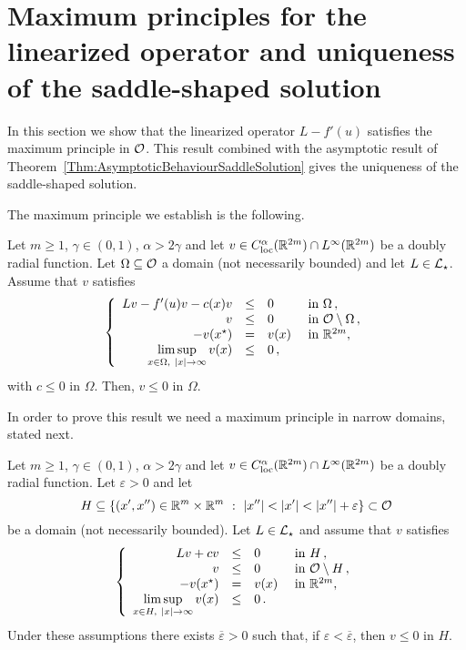 \section{Maximum principles for the linearized operator and uniqueness of the saddle-shaped solution}
\label{Sec:MaximumPrinciple}

In this section we show that the linearized operator $L -f'(u)$ satisfies the maximum principle in $\mathcal{O}$. This result combined with the asymptotic result of Theorem~\ref{Thm:AsymptoticBehaviourSaddleSolution} gives the uniqueness of the saddle-shaped solution.

The maximum principle we establish is the following.

\begin{proposition}
	\label{Prop:MaximumPrincipleInO}
	Let $m\geq 1$, $\gamma \in (0,1)$, $\alpha > 2\gamma$ and let $v\in C^\alpha_{\mathrm{loc}}(\mathbb{R}^{2m})\cap L^\infty(\mathbb{R}^{2m})$ be a doubly radial function. Let $\Omega \subseteq \mathcal{O}$ a domain (not necessarily bounded) and let $L \in \mathcal{L}_\star$. Assume that $v$ satisfies
	$$
	\left\{\begin{array}{rcll}
	Lv - f'(u)v - c(x)v &\leq & 0 &\textrm{ in } \Omega\,,\\
	v &\leq & 0 &\textrm{ in } \mathcal{O} \setminus \Omega\,,\\
	- v(x^\star) & = & v(x) &\textrm{ in } \mathbb{R}^{2m},\\
	\displaystyle \limsup_{x\in \Omega, \ |x|\to \infty} v(x) &\leq & 0\,,
	\end{array} \right.
	$$
	with $c\leq 0$ in $\Omega$.
	Then, $v \leq 0$ in $\Omega$.
\end{proposition}

In order to prove this result we need a maximum principle in narrow domains, stated next.

\begin{proposition}
	\label{Prop:MaximumPrincipleNarrowDomainsOdd}
	Let $m\geq 1$, $\gamma \in (0,1)$, $\alpha > 2\gamma$ and let $v\in C^\alpha_{\mathrm{loc}}(\mathbb{R}^{2m})\cap L^\infty(\mathbb{R}^{2m})$ be a doubly radial function. Let $\varepsilon>0$ and let
	$$
	H \subseteq \{(x',x'')\in \R^m\times\R^m \ : \ |x''|<|x'|<|x''|+ \varepsilon\} \subset \ocal
	$$ 
	be a domain (not necessarily bounded). Let $L \in \mathcal{L}_\star$ and assume that $v$ satisfies
	\begin{equation}
	\label{Eq:AssumptionsMaxPNarrow}
	\left\{\begin{array}{rcll}
	Lv + cv&\leq & 0 &\textrm{ in } H\,,\\
	v &\leq & 0 &\textrm{ in } \mathcal{O} \setminus H\,,\\
	- v(x^\star) & = & v(x) &\textrm{ in } \mathbb{R}^{2m},\\
	\displaystyle \limsup_{x\in H, \ |x|\to \infty} v(x) &\leq & 0\,.
	\end{array} \right.
	\end{equation}
	Under these assumptions there exists $\overline{\varepsilon}>0$ such that, if $\varepsilon<\overline{\varepsilon}$, then $v \leq 0$ in $H$.
\end{proposition}

